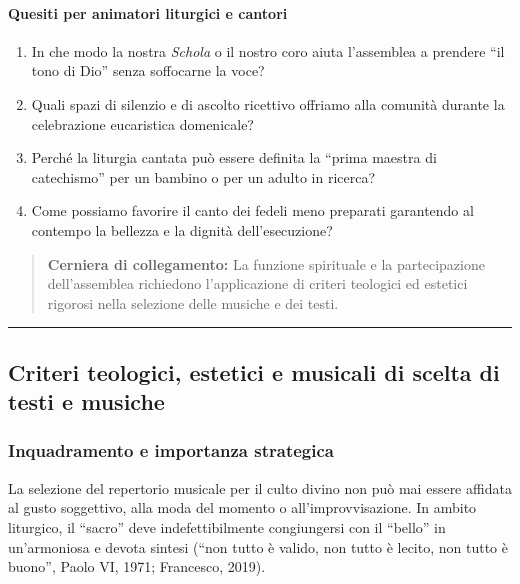 \documentclass[12pt,a4paper]{article}
\begin{document}
	\paragraph{Quesiti per animatori liturgici e cantori}\label{quesiti-per-animatori-liturgici-e-cantori}
	
	\begin{enumerate}[label=\arabic*.,leftmargin=*]
		\item In che modo la nostra \emph{Schola} o il nostro coro aiuta l'assemblea a prendere ``il tono di Dio'' senza soffocarne la voce?
		\item Quali spazi di silenzio e di ascolto ricettivo offriamo alla comunità durante la celebrazione eucaristica domenicale?
		\item Perché la liturgia cantata può essere definita la ``prima maestra di catechismo'' per un bambino o per un adulto in ricerca?
		\item Come possiamo favorire il canto dei fedeli meno preparati garantendo al contempo la bellezza e la dignità dell'esecuzione?
	\end{enumerate}
	
	\begin{quote}
		\textbf{Cerniera di collegamento:} La funzione spirituale e la partecipazione dell'assemblea richiedono l'applicazione di criteri teologici ed estetici rigorosi nella selezione delle musiche e dei testi.
	\end{quote}
	
	\begin{center}\rule{0.5\linewidth}{0.5pt}\end{center}
	
	\subsection{Criteri teologici, estetici e musicali di scelta di testi e musiche}\label{criteri-teologici-estetici-e-musicali-di-scelta-di-testi-e-musiche}
	
	\subsubsection{Inquadramento e importanza strategica}\label{inquadramento-e-importanza-strategica-5}
	
	La selezione del repertorio musicale per il culto divino non può mai essere affidata al gusto soggettivo, alla moda del momento o all'improvvisazione. In ambito liturgico, il ``sacro'' deve indefettibilmente congiungersi con il ``bello'' in un'armoniosa e devota sintesi (``non tutto è valido, non tutto è lecito, non tutto è buono'', Paolo VI, 1971; Francesco, 2019).
	
\end{document}
